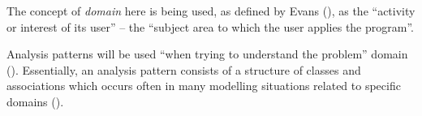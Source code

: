 The concept of \emph{domain} here is being used, as defined by Evans
(\citeyear[][p.~2]{evans2004domain}), as the ``activity or interest of its
user'' -- the ``subject area to which the user applies the program''.

Analysis patterns will be used ``when trying to understand the problem'' domain
(\cite[][Section~1.1]{fowler1997analysis}). Essentially, an analysis pattern
consists of a structure of classes and associations which occurs often in many
modelling situations related to specific domains
(\cite[][p.~254]{bennett2010object}).

